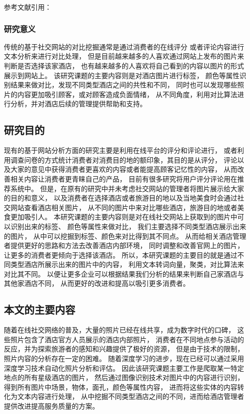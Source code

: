 \documentclass[cs4size,a4paper]{ctexart}
\numberwithin{equation}{section}
\numberwithin{table}{section}
\numberwithin{figure}{section}
\newcommand{\upcite}[1]{\textsuperscript{\textsuperscript{\cite{#1}}}}%
\begin{document}
参考文献引用：~\upcite{huang2008stock}


\subsubsection{研究意义}

传统的基于社交网站的对比挖掘通常是通过消费者的在线评分
或者评论内容进行文本分析来进行对比处理，
但是目前越来越多的人喜欢通过网站上发布的图片来判断是否选择该家酒店，
也有越来越多的人喜欢将自己看到的内容以图片的形式展示到网站上。
该研究课题的主要内容则是对酒店图片进行标签，
颜色等属性识别结果来做对比，发现不同类型酒店之间的共性和不同，
同时也可以发现哪些照片的内容更加吸引顾客，或对顾客造成负面情绪，
从不同角度，利用对比算法进行分析，并对酒店后续的管理提供帮助和支持。

\subsection{研究目的}

现有的基于网站分析方面的研究主要是利用在线平台的评分和评论进行，
或者利用调查问卷的方式统计消费者对消费目的地的额印象，其目的是从评分，
评论以及大家的意见中获得消费者更喜欢的内容或者能提高顾客记忆性的内容，
从而改善相关内容让消费者更青睐自己的产品，
目前有很多研究将用户评分评论用在推荐系统中。
但是，在原有的研究中并未考虑社交网站的管理者将图片展示给大家的目的和意义，
以及消费者在选择酒店或者旅游目的地以及当地美食时会通过社交网站查看酒店相关图片，
从不同的图片中来对比哪些酒店，旅游目的地或者美食更加吸引人。
本研究课题的主要内容则是对在线社交网站上获取到的图片中可以识别出来的标签、
颜色等属性来做对比，
我们主要选择不同类型酒店展示出来的图片，
从中可以挖掘到标签、颜色来对比得到其不同点。
从而给相关酒店管理者提供更好的思路和方法去改善酒店内部环境，
同时调整和改善官网上的图片，让更多的消费者更倾向于选择该酒店。
所以，本研究课题的主要目的就是通过不同类型酒店所展示出来的图片中的内容，
利用文本转词向量，聚类，对比算法来对比其不同。
以便让更多企业可以根据结果我们分析的结果来判断自己家酒店与其他家酒店不同，
从而更好的改进和提高以吸引更多消费者。

\subsection{本文的主要内容}

随着在线社交网络的普及，大量的照片已经在线共享，成为数字时代的口碑，
这些照片包含了酒店官方人员展示的酒店内部照片，
消费者在不同地点参与活动的反应，并为探索旅游者的感知和兴趣提供了极好的资源，
但是由于技术的限制，照片内容的分析存在一定的困难。
随着深度学习的进步，现在已经可以通过采用深度学习技术自动化照片分析和评估。
因此该研究课题主要工作是爬取某一特定地点的所有星级酒店的图片，
然后通过图像识别技术对图片中的内容进行识别，
得到所有图片中场景，物体，面孔，颜色等属性内容，
进而将这些实体的内容转化为文本内容进行处理，
从中挖掘不同类型酒店之间的不同，进而给酒店管理者提供改进提高服务质量的方案。
\end{document}
